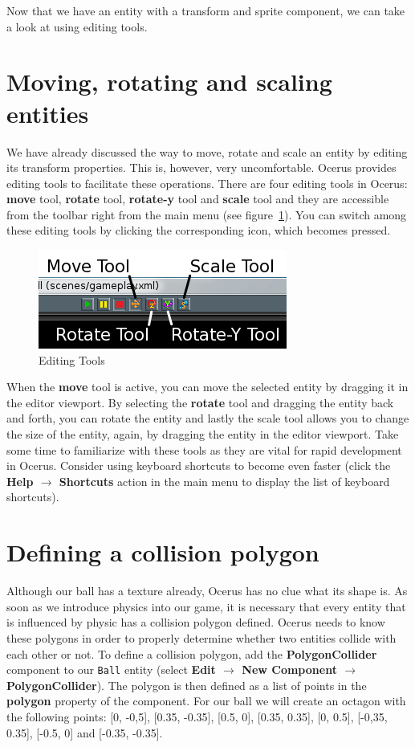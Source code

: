 \documentclass[a4paper,12pt]{article}
\begin{document}
Now that we have an entity with a transform and sprite component, we can take a look at using editing tools.

\section{Moving, rotating and scaling entities}
We have already discussed the way to move, rotate and scale an entity by editing its transform properties. This is, however, very uncomfortable. Ocerus provides editing tools to facilitate these operations. There are four editing tools in Ocerus: \textbf{move} tool, \textbf{rotate} tool, \textbf{rotate-y} tool and \textbf{scale} tool and they are accessible from the toolbar right from the main menu (see figure~\ref{fig:editing_tools}). You can switch among these editing tools by clicking the corresponding icon, which becomes pressed.

\begin{figure}[ht]
 \begin{center}
  \includegraphics[scale=0.65]{EditingTools}
 \end{center}
 \caption{Editing Tools}
 \label{fig:editing_tools}
\end{figure}


When the \textbf{move} tool is active, you can move the selected entity by dragging it in the editor viewport. By selecting the \textbf{rotate} tool and dragging the entity back and forth, you can rotate the entity and lastly the scale tool allows you to change the size of the entity, again, by dragging the entity in the editor viewport. Take some time to familiarize with these tools as they are vital for rapid development in Ocerus. Consider using keyboard shortcuts to become even faster (click the \textbf{Help $\to$ Shortcuts} action in the main menu to display the list of keyboard shortcuts).

\section{Defining a collision polygon}
Although our ball has a texture already, Ocerus has no clue what its shape is. As soon as we introduce physics into our game, it is necessary that every entity that is influenced by physic has a collision polygon defined. Ocerus needs to know these polygons in order to properly determine whether two entities collide with each other or not. To define a collision polygon, add the \textbf{PolygonCollider} component to our \texttt{Ball} entity (select \textbf{Edit $\to$ New Component $\to$ PolygonCollider}). The polygon is then defined as a list of points in the \textbf{polygon} property of the component. For our ball we will create an octagon with the following points: [0, -0,5], [0.35, -0.35], [0.5, 0], [0.35, 0.35], [0, 0.5], [-0,35, 0.35], [-0.5, 0] and [-0.35, -0.35].
\end{document}
